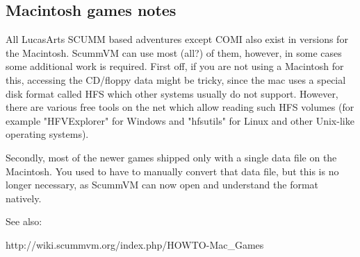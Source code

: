 


\subsection {Macintosh games notes}

All LucasArts SCUMM based adventures except COMI also exist in versions for the
Macintosh. ScummVM can use most (all?) of them, however, in some cases some
additional work is required. First off, if you are not using a Macintosh for
this, accessing the CD/floppy data might be tricky, since the mac uses a
special disk format called HFS which other systems usually do not support.
However, there are various free tools on the net which allow reading such HFS
volumes (for example "HFVExplorer" for Windows and "hfsutils" for Linux and
other Unix-like operating systems).

Secondly, most of the newer games shipped only with a  single data file on the
Macintosh. You used to have to manually convert that data file, but this is no
longer necessary, as ScummVM can now open and understand the format natively.

See also:

  http://wiki.scummvm.org/index.php/HOWTO-Mac_Games
